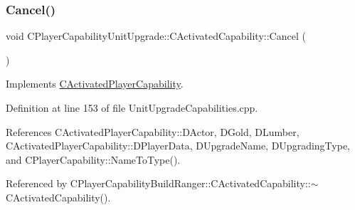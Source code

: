 \subsubsection{\texorpdfstring{Cancel()}{Cancel()}}
{\footnotesize\ttfamily void C\+Player\+Capability\+Unit\+Upgrade\+::\+C\+Activated\+Capability\+::\+Cancel (\begin{DoxyParamCaption}{ }\end{DoxyParamCaption})\hspace{0.3cm}{\ttfamily [virtual]}}



Implements \hyperlink{classCActivatedPlayerCapability_a5cde83be468e262ad054d81e28684a81}{C\+Activated\+Player\+Capability}.



Definition at line 153 of file Unit\+Upgrade\+Capabilities.\+cpp.



References C\+Activated\+Player\+Capability\+::\+D\+Actor, D\+Gold, D\+Lumber, C\+Activated\+Player\+Capability\+::\+D\+Player\+Data, D\+Upgrade\+Name, D\+Upgrading\+Type, and C\+Player\+Capability\+::\+Name\+To\+Type().



Referenced by C\+Player\+Capability\+Build\+Ranger\+::\+C\+Activated\+Capability\+::$\sim$\+C\+Activated\+Capability().


